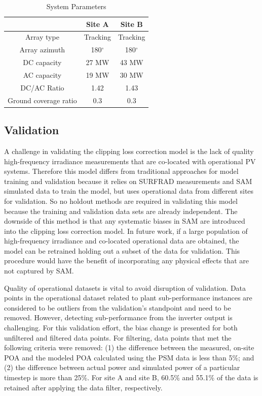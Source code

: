 \documentclass[conference]{IEEEtran}
\begin{document}
\begin{table}[htbp]
\caption{System Parameters}
\begin{center}
\begin{tabular}{ |c|c|c| } 
\hline
& Site A & Site B \\
\hline
\cellcolor{gray}Array type & Tracking & Tracking \\
\hline
\cellcolor{gray}Array azimuth & 180$^{\circ}$ & 180$^{\circ}$\\
\hline
\cellcolor{gray}DC capacity & 27 MW & 43 MW\\
\hline
\cellcolor{gray}AC capacity & 19 MW & 30 MW \\
\hline
\cellcolor{gray}DC/AC Ratio & 1.42 & 1.43 \\
\hline
\cellcolor{gray}Ground coverage ratio & 0.3 & 0.3 \\
\hline
\end{tabular}
\end{center}
\label{table1}
\end{table}



\subsection{Validation}
A challenge in validating the clipping loss correction model is the lack of quality high-frequency irradiance measurements that are co-located with operational PV systems. Therefore this model differs from traditional approaches for model training and validation because it relies on SURFRAD measurements and SAM simulated data to train the model, but uses operational data from different sites for validation. So no holdout methods are required in validating this model because the training and validation data sets are already independent. The downside of this method is that any systematic biases in SAM are introduced into the clipping loss correction model. In future work, if a large population of high-frequency irradiance and co-located operational data are obtained, the model can be retrained holding out a subset of the data for validation. This procedure would have the benefit of incorporating any physical effects that are not captured by SAM.

Quality of operational datasets is vital to avoid disruption of validation. Data points in the operational dataset related to plant sub-performance instances are considered to be outliers from the validation's standpoint and need to be removed. However, detecting sub-performance from the inverter output is challenging. For this validation effort, the bias change is presented for both unfiltered and filtered data points. For filtering, data points that met the following criteria were removed: (1) the difference between the measured, on-site POA and the modeled POA calculated using the PSM data is less than 5\%; and (2) the difference between actual power and simulated power of a particular timestep is more than 25\%. For site A and site B, 60.5\% and 55.1\% of the data is retained after applying the data filter, respectively.
\end{document}
